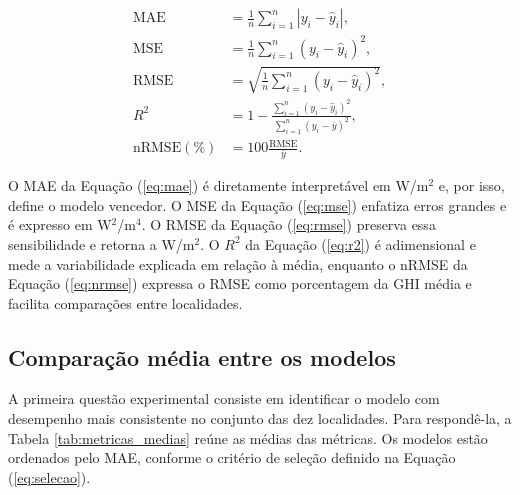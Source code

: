 \documentclass[11pt,a4paper]{article}
\begin{document}
\begin{align}
\mathrm{MAE} &= \frac{1}{n}\sum_{i=1}^{n}|y_i-\hat{y}_i|, \label{eq:mae}\\
\mathrm{MSE} &= \frac{1}{n}\sum_{i=1}^{n}(y_i-\hat{y}_i)^2, \label{eq:mse}\\
\mathrm{RMSE} &= \sqrt{\frac{1}{n}\sum_{i=1}^{n}(y_i-\hat{y}_i)^2}, \label{eq:rmse}\\
R^2 &= 1-\frac{\sum_{i=1}^{n}(y_i-\hat{y}_i)^2}{\sum_{i=1}^{n}(y_i-\bar{y})^2}, \label{eq:r2}\\
\mathrm{nRMSE}(\%) &= 100\frac{\mathrm{RMSE}}{\bar{y}}. \label{eq:nrmse}
\end{align}

O MAE da Equação (\ref{eq:mae}) é diretamente interpretável em W/m$^2$ e, por isso, define o modelo vencedor. O MSE da Equação (\ref{eq:mse}) enfatiza erros grandes e é expresso em W$^2$/m$^4$. O RMSE da Equação (\ref{eq:rmse}) preserva essa sensibilidade e retorna a W/m$^2$. O $R^2$ da Equação (\ref{eq:r2}) é adimensional e mede a variabilidade explicada em relação à média, enquanto o nRMSE da Equação (\ref{eq:nrmse}) expressa o RMSE como porcentagem da GHI média e facilita comparações entre localidades.

\subsection{Comparação média entre os modelos}

A primeira questão experimental consiste em identificar o modelo com desempenho mais consistente no conjunto das dez localidades. Para respondê-la, a Tabela \ref{tab:metricas_medias} reúne as médias das métricas. Os modelos estão ordenados pelo MAE, conforme o critério de seleção definido na Equação (\ref{eq:selecao}).

\begin{table}[htbp]
\centering
\caption{Métricas médias mensais dos modelos avaliados.}
\label{tab:metricas_medias}
\small
{}
\end{table}
\end{document}

